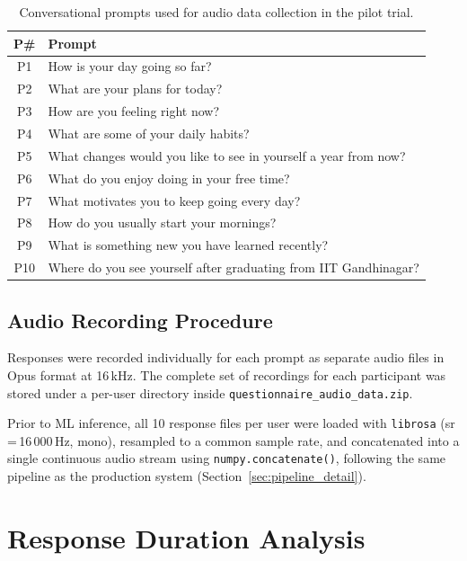 \begin{table}[h]
\centering
\caption{Conversational prompts used for audio data collection in the pilot trial.}
\label{tab:questionnaire}
\begin{tabular}{@{}cp{10.5cm}@{}}
\toprule
\textbf{P\#} & \textbf{Prompt} \\
\midrule
P1  & How is your day going so far? \\
P2  & What are your plans for today? \\
P3  & How are you feeling right now? \\
P4  & What are some of your daily habits? \\
P5  & What changes would you like to see in yourself a year from now? \\
P6  & What do you enjoy doing in your free time? \\
P7  & What motivates you to keep going every day? \\
P8  & How do you usually start your mornings? \\
P9  & What is something new you have learned recently? \\
P10 & Where do you see yourself after graduating from IIT Gandhinagar? \\
\bottomrule
\end{tabular}
\end{table}

\subsection{Audio Recording Procedure}

Responses were recorded individually for each prompt as separate audio files in Opus format at 16\,kHz. The complete set of recordings for each participant was stored under a per-user directory inside \texttt{questionnaire\_audio\_data.zip}.

Prior to ML inference, all 10 response files per user were loaded with \texttt{librosa} (sr\,=\,16\,000\,Hz, mono), resampled to a common sample rate, and concatenated into a single continuous audio stream using \texttt{numpy.concatenate()}, following the same pipeline as the production system (Section~\ref{sec:pipeline_detail}).

\section{Response Duration Analysis}


